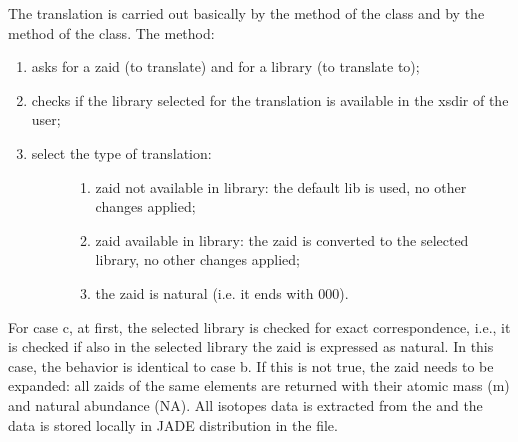 \documentclass[letterpaper,10pt,english]{sphinxmanual}
\begin{document}
\sphinxAtStartPar
The translation is carried out basically by the  method of the
 class and by the  method of the  class.
The  method:
\begin{enumerate}
%
\item {} 
\sphinxAtStartPar
asks for a zaid (to translate) and for a library (to translate to);

\item {} 
\sphinxAtStartPar
checks if the library selected for the translation is available in the xsdir of
the user;

\item {} \begin{description}
\item[{select the type of translation:}] \leavevmode\begin{enumerate}
%
\item {} 
\sphinxAtStartPar
zaid not available in library: the default lib is used, no other changes
applied;

\item {} 
\sphinxAtStartPar
zaid available in library: the zaid is converted to the selected library,
no other changes applied;

\item {} 
\sphinxAtStartPar
the zaid is natural (i.e. it ends with 000).

\end{enumerate}

\end{description}

\end{enumerate}

\sphinxAtStartPar
For case c, at first, the selected library is checked for exact correspondence,
i.e., it is checked if also in the selected library the zaid is expressed as natural.
In this case, the behavior is identical to case b. If this is not true, the zaid needs
to be expanded: all zaids of the same elements are returned with their atomic mass (m)
and natural abundance (NA). All isotopes data is extracted from the
and the data is stored locally in JADE distribution in the
 file.
\end{document}
